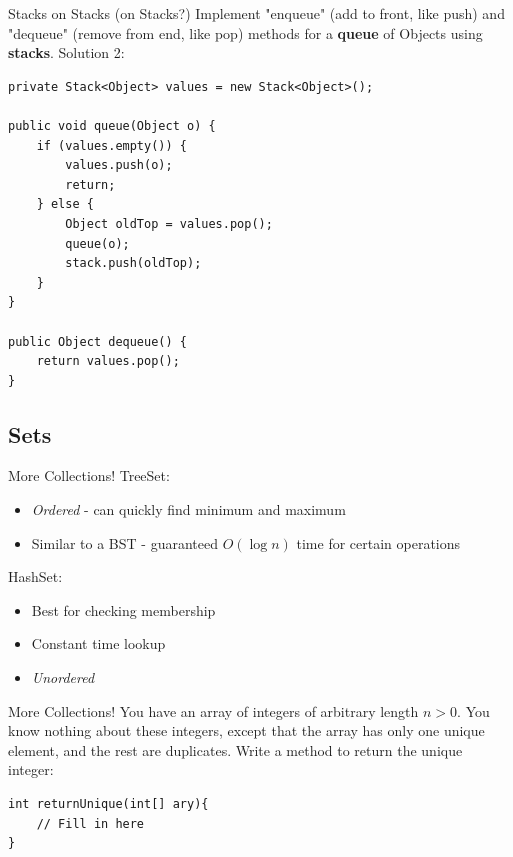 \documentclass[9pt]{beamer}
\begin{document}
\begin{frame}[fragile]{\Huge{Stacks on Stacks (on Stacks?)}}
Implement "enqueue" (add to front, like push) and "dequeue" (remove from end, like pop) methods for a \textbf{queue} of Objects using \textbf{stacks}. Solution 2:
\begin{lstlisting}
private Stack<Object> values = new Stack<Object>();

public void queue(Object o) {
    if (values.empty()) {
        values.push(o);
        return;
    } else {
        Object oldTop = values.pop();
        queue(o);
        stack.push(oldTop);
    }
}

public Object dequeue() {
    return values.pop();
}
\end{lstlisting}
\end{frame}


\subsection{Sets}

\begin{frame}[fragile]{\Huge{More Collections!}}
TreeSet:
\begin{itemize}
\item \emph{Ordered} - can quickly find minimum and maximum
\item Similar to a BST - guaranteed $O(\log{n})$ time for certain operations
\end{itemize}
HashSet:
\begin{itemize}
\item Best for checking membership
\item Constant time lookup
\item \emph{Unordered}
\end{itemize}
\end{frame}

\begin{frame}[fragile]{\Huge{More Collections!}}
You have an array of integers of arbitrary length $n > 0$. \newline \newline
You know nothing about these integers, except that the array has only one unique element, and the rest are duplicates. \newline \newline
Write a method to return the unique integer:
\begin{lstlisting}
int returnUnique(int[] ary){
    // Fill in here
}
\end{lstlisting}
\end{frame}
\end{document}
